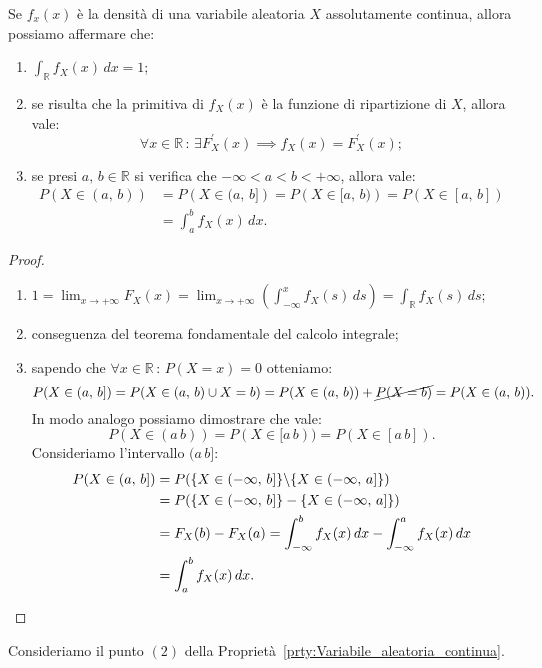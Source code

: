         \begin{prty}\label{prty:Variabile_aleatoria_continua}
            Se $f_x(x)$ è la densità di una variabile aleatoria $X$ assolutamente continua, allora possiamo affermare che:
            \begin{enumerate}
                \item $\int_{\mathbb{R}} f_X(x)\, dx = 1$;
                \item se risulta che la primitiva di $f_X(x)$ è la funzione di ripartizione di $X$, allora vale: \[
                        \forall x \in \mathbb{R} \,:\, \exists F^{\prime}_X(x) \implies f_X(x) = F_X^{\prime}(x)
                ;\]
            \item se presi $a,\, b \in \mathbb{R}$ si verifica che $-\infty < a < b < +\infty$, allora vale:
                \begin{align*}
                    P\left(X \in (a,\,b)\right) &= P\left(X \in (a,\,b]\right) = P\left(X \in [a,\,b)\right) = P\left(X \in [a,\,b]\right) \\
                                   &= \int_{a}^{b} f_X(x)\, dx
                .\end{align*}
            \end{enumerate}
            \begin{proof}
                \hfill
                \begin{enumerate}
                    \item $1 = \lim_{x \to +\infty} F_X(x) = \lim_{x \to +\infty} \left(\int_{-\infty}^{x} f_X(s)\, ds\right) = \int_{\mathbb{R}} f_X(s)\, ds$;
                    \item conseguenza del teorema fondamentale del calcolo integrale;
                    \item sapendo che $\forall x \in \mathbb{R} \,:\, P(X = x) = 0$ otteniamo: \[
                        P(X \in (a,\,b]) = P({X \in (a,\,b)} \cup {X = b}) = P(X \in (a,\,b)) + \cancel{P(X = b)} = P(X \in (a,\,b))
                    .\] In modo analogo possiamo dimostrare che vale:\[
                        P(X \in (a\,b)) = P(X \in [a\,b)) = P(X \in [a\,b]) 
                    .\] Consideriamo l'intervallo $(a\,b]$:
                    \begin{align*}
                        P(X \in (a,\,b]) &= P(\{X \in (-\infty,\,b]\} \backslash \{X \in (-\infty,\,a]\}) \\
                                      &= P(\{X \in (-\infty,\,b]\} - \{X \in (-\infty,\,a]\}) \\
                                      &= F_X(b) - F_X(a) = \int_{-\infty}^{b} f_X(x)\, dx - \int_{-\infty}^{a} f_X(x)\, dx \\
                                      &= \int_{a}^{b} f_X(x)\, dx \qedhere
                    .\end{align*}
                \end{enumerate}
            \end{proof}
            \begin{prty}\label{prty:Assoluta_continuità}
                Consideriamo il punto $(2)$ della Proprietà~\ref{prty:Variabile_aleatoria_continua}.


\end{prty}
\end{prty}

